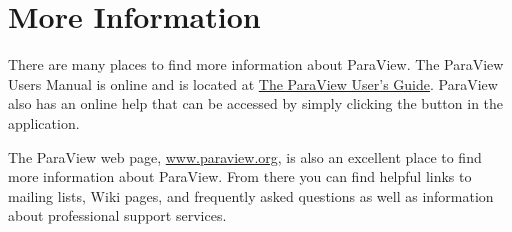 \section{More Information}

There are many places to find more information about ParaView. The ParaView
Users Manual is online and is located at \href{http://paraview.org/Wiki/ParaView/Users_Guide/Table_Of_Contents}{The ParaView User's Guide}.  
ParaView also has an online help that can be accessed by simply clicking the  button in the application.  

The ParaView web page, \href{http://www.paraview.org}{www.paraview.org}, is
also an excellent place to find more information about ParaView.  From
there you can find helpful links to mailing lists, Wiki pages, and
frequently asked questions as well as information about professional
support services.



